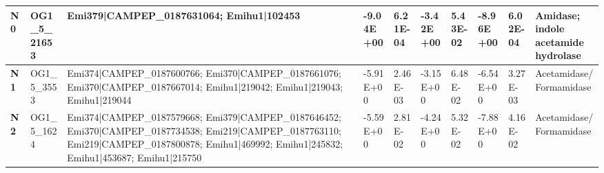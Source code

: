 \begin{landscape}
\begin{center}
\begin{footnotesize}
\begin{longtable}{|p{0.5cm}|p{1.5cm}|p{4cm}|l|l|l|l|l|l|l|}
\textbf{N0}  & OG1\_5\_21653 & Emi379|CAMPEP\_0187631064; Emihu1|102453                                                                                                                                                                                                                                                                                                                                                                                                                                                                                                                                                                                                 & -9.04E+00 & 6.21E-04 & -3.42E+00 & 5.43E-02 & -8.96E+00 & 6.02E-04 & Amidase; indole acetamide hydrolase                                          \\ \hline
\textbf{N1}  & OG1\_5\_3553  & Emi374|CAMPEP\_0187600766; Emi370|CAMPEP\_0187661076; Emi370|CAMPEP\_0187667014; Emihu1|219042; Emihu1|219043; Emihu1|219044                                                                                                                                                                                                                                                                                                                                                                                                                                                                                                             & -5.91E+00 & 2.46E-03 & -3.15E+00 & 6.48E-02 & -6.54E+00 & 3.27E-03 & Acetamidase/Formamidase                                                      \\ \hline
\textbf{N2}  & OG1\_5\_1624  & Emi374|CAMPEP\_0187579668; Emi379|CAMPEP\_0187646452; Emi370|CAMPEP\_0187734538; Emi219|CAMPEP\_0187763110; Emi219|CAMPEP\_0187800878; Emihu1|469992; Emihu1|245832; Emihu1|453687; Emihu1|215750                                                                                                                                                                                                                                                                                                                                                                                                                                        & -5.59E+00 & 2.81E-02 & -4.24E+00 & 5.32E-02 & -7.88E+00 & 4.16E-02 & Acetamidase/Formamidase                                                      \\ \hline

\end{longtable}
\end{footnotesize}
\end{center}
\end{landscape}
